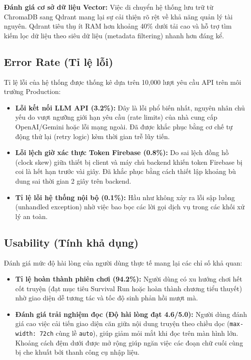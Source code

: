 \documentclass[a4paper]{article}
\begin{document}
\begin{titlepage}
\textbf{Đánh giá cơ sở dữ liệu Vector:} Việc di chuyển hệ thống lưu trữ từ ChromaDB sang Qdrant mang lại sự cải thiện rõ rệt về khả năng quản lý tài nguyên. Qdrant tiêu thụ ít RAM hơn khoảng 40\% dưới tải cao và hỗ trợ tìm kiếm lọc dữ liệu theo siêu dữ liệu (metadata filtering) nhanh hơn đáng kể.

\subsection{Error Rate (Tỉ lệ lỗi)}
Tỉ lệ lỗi của hệ thống được thống kê dựa trên 10,000 lượt yêu cầu API trên môi trường Production:
\begin{itemize}
    \item \textbf{Lỗi kết nối LLM API (3.2\%):} Đây là lỗi phổ biến nhất, nguyên nhân chủ yếu do vượt ngưỡng giới hạn yêu cầu (rate limits) của nhà cung cấp OpenAI/Gemini hoặc lỗi mạng ngoài. Đã được khắc phục bằng cơ chế tự động thử lại (retry logic) kèm thời gian trễ lũy tiến.
    \item \textbf{Lỗi lệch giờ xác thực Token Firebase (0.8\%):} Do sai lệch đồng hồ (clock skew) giữa thiết bị client và máy chủ backend khiến token Firebase bị coi là hết hạn trước vài giây. Đã khắc phục bằng cách thiết lập khoảng bù dung sai thời gian 2 giây trên backend.
    \item \textbf{Tỉ lệ lỗi hệ thống nội bộ (0.1\%):} Hầu như không xảy ra lỗi sập luồng (unhandled exception) nhờ việc bao bọc các lời gọi dịch vụ trong các khối xử lý an toàn.
\end{itemize}

\subsection{Usability (Tính khả dụng)}
Đánh giá mức độ hài lòng của người dùng thực tế mang lại các chỉ số khả quan:
\begin{itemize}
    \item \textbf{Tỉ lệ hoàn thành phiên chơi (94.2\%):} Người dùng có xu hướng chơi hết cốt truyện (đạt mục tiêu Survival Run hoặc hoàn thành chương tiểu thuyết) nhờ giao diện dễ tương tác và tốc độ sinh phản hồi mượt mà.
    \item \textbf{Đánh giá trải nghiệm đọc (Độ hài lòng đạt 4.6/5.0):} Người dùng đánh giá cao việc cải tiến giao diện căn giữa nội dung truyện theo chiều dọc (\texttt{max-width: 72ch} cùng lề \texttt{auto}), giúp giảm mỏi mắt khi đọc trên màn hình lớn. Khoảng cách đệm dưới được mở rộng giúp ngăn việc các đoạn chữ cuối cùng bị che khuất bởi thanh công cụ nhập liệu.
\end{itemize}


\end{titlepage}
\end{document}
